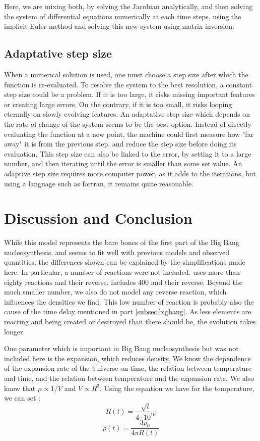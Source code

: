 \documentclass[a4paper, 12pt]{article}
\begin{document}
Here, we are mixing both, by solving the Jacobian analytically, and then solving the system of differential equations numerically at each time steps, using the implicit Euler method and solving this new system using matrix inversion.

\subsection{Adaptative step size}
When a numerical solution is used, one must choose a step size after which the function is re-evaluated. To resolve the system to the best resolution, a constant step size could be a problem. If it is too large, it risks missing important features or creating large errors. On the contrary, if it is too small, it risks looping eternally on slowly evolving features. An adaptative step size which depends on the rate of change of the system seems to be the best option. Instead of directly evaluating the function at a new point, the machine could first measure how "far away" it is from the previous step, and reduce the step size before doing its evaluation. This step size can also be linked to the error, by setting it to a large number, and then iterating until the error is smaller than some set value. An adaptive step size requires more computer power, as it adds to the iterations, but using a language such as fortran, it remains quite reasonable.


\section{Discussion and Conclusion}
\label{sec:disc}

While this model represents the bare bones of the first part of the Big Bang nucleosynthesis, and seems to fit well with previous models and observed quantities, the differences shown can be explained by the simplifications made here. In particular, a number of reactions were not included. \cite{wagoner_synthesis_1967} uses more than eighty reactions and their reverse. \cite{pitrou_precision_2018} includes 400 and their reverse. Beyond the much smaller number, we also do not model any reverse reaction, which influences the densities we find. This low number of reaction is probably also the cause of the time delay mentioned in part \ref{subsec:bigbang}. As less elements are reacting and being created or destroyed than there should be, the evolution takes longer.

One parameter which is important in Big Bang nucleosynthesis but was not included here is the expansion, which reduces density. We know the dependence of the expansion rate of the Universe on time, the relation between temperature and time, and the relation between temperature and the expansion rate. We also know that $\rho \propto 1/V$ and $V \propto R^3$. Using the equation we have for the temperature, we can set :
$$R(t) = \frac{\sqrt{t}}{4\cdot10^{10}}$$
$$\rho(t) = \frac{3\rho_0}{4\pi R(t)}$$
\end{document}
